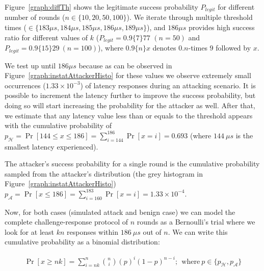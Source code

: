 Figure~\ref{graph:diffTh} shows the legitimate success probability $P_{legit}$ for different number of rounds ($n\in\{10,20,50,100\}$). We iterate through multiple threshold times (\connect$\in\{183\mu s,184\mu s,185\mu s, 186\mu s, 189\mu s\}$), and $186\mu s$ provides high success ratio for different values of $k$ ($P_{legit}=0.9\{7\}77$ $(n=50)$ and $P_{legit}=0.9\{15\}29\ (n=100)$), where $0.9\{n\}x$ denotes $0.n$-times $9$ followed by $x$.

We test \connect up until $186 \mu s$ because as can be observed in Figure~\ref{graph:instatAttackerHisto} for these values we observe extremely small occurrences ($1.33\times10^{-3}$) of latency responses during an attacking scenario. It is possible to increment the latency further to improve the success probability, but doing so will start increasing the probability for the attacker as well. 
%
After that, we estimate that any latency value less than or equals to the threshold \connect appears with the cumulative probability of $p_{\mathcal{H}} = \Pr[144\leq x \leq 186] = \sum_{i=144}^{186}\Pr[x=i] = 0.693$ (where $144\ \mu s$ is the smallest latency experienced).

The attacker's success probability for a single round is the cumulative probability sampled from the attacker's distribution (the grey histogram in Figure~\ref{graph:instatAttackerHisto}) $p_\mathcal{A} = \Pr[x \leq 186] = \sum_{i=160}^{183}\Pr[x=i] = 1.33 \times 10^{-4}$.


Now, for both cases (simulated attack and benign case) we can model the complete challenge-response protocol of $n$ rounds as a Bernoulli's trial where we look for at least $kn$ responses within $186\ \mu s$ out of $n$. We can write this cumulative probability as a binomial distribution:
%

\begin{align*}
    \Pr[x \geq nk] = \sum_{i=nk}^n\binom{n}{i} (p)^{i}(1-p)^{n-i};~~\text{where}~ p \in \{p_\mathcal{H}, p_\mathcal{A}\}
\end{align*}


\newcommand{\roundCompCaption}{\textbf{Finding suitable fraction $k$.} The graph shows the legitimate enclave's success probability in an ideal scenario and the attacker's success probability in rerouting attack scenario with varying $k$.}

